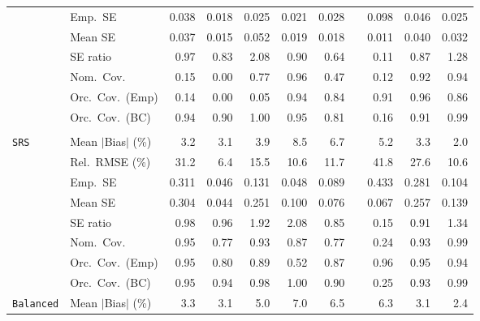 \begin{landscape}
\begin{longtable}{llrrrrrrrrr}
 & Emp.\ SE & 0.038 & 0.018 & 0.025 & 0.021 & 0.028 &  & 0.098 & 0.046 & 0.025 \\
 & Mean SE & 0.037 & 0.015 & 0.052 & 0.019 & 0.018 &  & 0.011 & 0.040 & 0.032 \\
 & SE ratio & \cellcolor{rankone}0.97 & 0.83 & 2.08 & \cellcolor{ranktwo}0.90 & 0.64 &  & 0.11 & \cellcolor{rankthree}0.87 & 1.28 \\
 & Nom.\ Cov. & 0.15 & 0.00 & \cellcolor{rankthree}0.77 & \cellcolor{rankone}0.96 & 0.47 &  & 0.12 & \cellcolor{ranktwo}0.92 & \cellcolor{rankone}0.94 \\
 & Orc.\ Cov.\ (Emp) & 0.14 & 0.00 & 0.05 & \cellcolor{rankone}0.94 & 0.84 &  & \cellcolor{ranktwo}0.91 & \cellcolor{rankone}0.96 & \cellcolor{rankthree}0.86 \\
 & Orc.\ Cov.\ (BC) & \cellcolor{ranktwo}0.94 & 0.90 & 1.00 & \cellcolor{rankone}0.95 & 0.81 &  & 0.16 & \cellcolor{rankthree}0.91 & \cellcolor{rankthree}0.99 \\
\addlinespace[2pt]
\multicolumn{11}{l}{\textbf{Binary \& Categorical Phase-One Covariates}} \\
\addlinespace[2pt]
\quad \texttt{SRS} & Mean $|$Bias$|$ (\%) & \cellcolor{rankthree}3.2 & \cellcolor{ranktwo}3.1 & 3.9 & 8.5 & 6.7 &  & 5.2 & 3.3 & \cellcolor{rankone}2.0 \\
 & Rel.\ RMSE (\%) & 31.2 & \cellcolor{rankone}6.4 & 15.5 & \cellcolor{ranktwo}10.6 & \cellcolor{rankthree}11.7 &  & 41.8 & 27.6 & \cellcolor{ranktwo}10.6 \\
 & Emp.\ SE & 0.311 & 0.046 & 0.131 & 0.048 & 0.089 &  & 0.433 & 0.281 & 0.104 \\
 & Mean SE & 0.304 & 0.044 & 0.251 & 0.100 & 0.076 &  & 0.067 & 0.257 & 0.139 \\
 & SE ratio & \cellcolor{rankone}0.98 & \cellcolor{ranktwo}0.96 & 1.92 & 2.08 & 0.85 &  & 0.15 & \cellcolor{rankthree}0.91 & 1.34 \\
 & Nom.\ Cov. & \cellcolor{rankone}0.95 & 0.77 & \cellcolor{ranktwo}0.93 & 0.87 & 0.77 &  & 0.24 & \cellcolor{ranktwo}0.93 & \cellcolor{rankthree}0.99 \\
 & Orc.\ Cov.\ (Emp) & \cellcolor{rankone}0.95 & 0.80 & \cellcolor{rankthree}0.89 & 0.52 & 0.87 &  & \cellcolor{ranktwo}0.96 & \cellcolor{rankone}0.95 & \cellcolor{ranktwo}0.94 \\
 & Orc.\ Cov.\ (BC) & \cellcolor{rankone}0.95 & \cellcolor{ranktwo}0.94 & 0.98 & 1.00 & 0.90 &  & 0.25 & \cellcolor{rankthree}0.93 & 0.99 \\
\addlinespace[2pt]
\quad \texttt{Balanced} & Mean $|$Bias$|$ (\%) & \cellcolor{rankthree}3.3 & \cellcolor{ranktwo}3.1 & 5.0 & 7.0 & 6.5 &  & 6.3 & \cellcolor{ranktwo}3.1 & \cellcolor{rankone}2.4 \\

\end{longtable}
\end{landscape}
